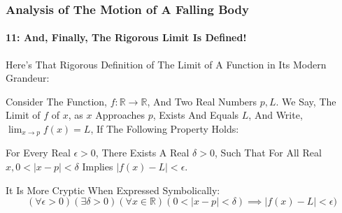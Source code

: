 \begin{frame}
\frametitle{Analysis of The Motion of \alert{A Falling Body}}
\framesubtitle{11: And, Finally, The Rigorous Limit Is Defined!}
\label{slide:analysis-of-falling-body-11}
Here's That Rigorous Definition of \alert{The Limit of A Function} in Its Modern Grandeur:
\begin{definition}
Consider The Function, $f:\mathbb{R}\rightarrow\mathbb{R}$, And Two Real Numbers $p,L$. We Say, \alert{The Limit of $f$ of $x$, as $x$ Approaches $p$, Exists And Equals $L$}, And Write, \alert{$\displaystyle{\lim_{x\to p}f(x)=L}$}, If The Following Property Holds:

\alert{For Every Real $\epsilon>0$, There Exists A Real $\delta>0$, Such That For All Real $x, 0<\mid x-p\mid<\delta$ Implies $\mid f(x)-L\mid<\epsilon$}.
\end{definition}
It Is More Cryptic When Expressed Symbolically:
\[
(\forall\epsilon>0)(\exists\delta>0)(\forall x\in\mathbb{R})(0<\mid x-p\mid<\delta)\implies\mid f(x)-L\mid<\epsilon)
\]
\end{frame}
